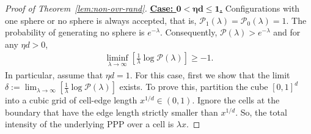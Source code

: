 \documentclass[11pt]{article}
\newcommand{\lt}{\left}
\newcommand{\rt}{\right}
\newcommand{\pno}{\mathcal{P}(\lambda)}
\begin{document}
\begin{appendices}
\begin{proof}[Proof of Theorem~\ref{lem:non-ovr-rand}]
\noindent
{\bf \underline{Case: $\boldsymbol{0 < \eta d \leq 1}$.}}
Configurations with one sphere or no sphere is always accepted, that is, $\mathcal{P}_1(\lambda) = \mathcal{P}_0(\lambda) = 1$.
The probability of generating no sphere is $e^{- \lambda}$. Consequently, $\pno  > e^{-\lambda}$ and for any $\eta d > 0$,
\begin{align}
\label{eqn:Triv_LB}
 \liminf_{\lambda \rightarrow \infty}\lt[\frac{1}{\lambda}\log \pno \rt] \geq - 1.
\end{align}
In particular, assume that $\eta d = 1$.
For this case, first we show that the limit $\delta := \lim_{\lambda \rightarrow \infty}\lt[\frac{1}{\lambda}\log \pno \rt]$ exists.
To prove this, partition the cube $[0,1]^d$ into a cubic grid of cell-edge length $x^{1/d} \in (0,1)$. Ignore the cells at the boundary that have the edge length strictly smaller than $x^{1/d}$. So, the total intensity of the underlying PPP over a cell is $\lambda x$. 


\end{proof}
\end{appendices}
\end{document}
